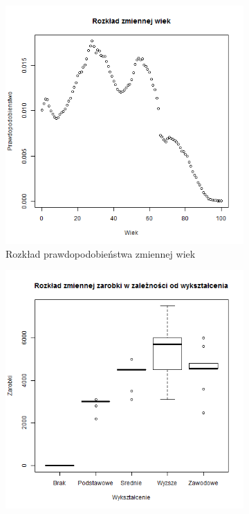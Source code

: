 \documentclass[polish, twoside, 12pt, a4paper]{article}
\theoremstyle{definition}
\theoremstyle{plain}
\theoremstyle{remark}
\begin{document}
\begin{figure}[hbt]
  \centering
  \begin{subfigure}[t]{0.45\textwidth}
    \includegraphics[width=\textwidth]{pictures/wiek.png}
    \caption{Rozkład prawdopodobieństwa zmiennej wiek}
    \label{fig:wiek}
  \end{subfigure}
  \hfill
  \begin{subfigure}[t]{0.45\textwidth}
    \includegraphics[width=\textwidth]{pictures/wyksztalcenie_zarobki.png}

\end{subfigure}
\end{figure}
\end{document}
